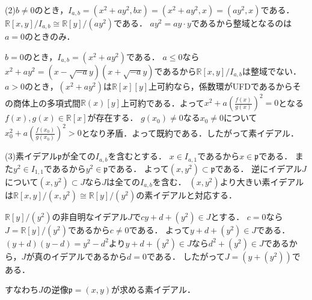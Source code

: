 \documentclass[
		book,
		head_space=20mm,
		foot_space=20mm,
		gutter=10mm,
		line_length=190mm
]{jlreq}
\begin{document}
(2)$b\neq0$のとき，$I_{a,b}=(x^2+ay^2,bx)=(x^2+ay^2,x)=(ay^2,x)$である．
$\mathbb{R}[x,y]/I_{a,b}\cong \mathbb{R}[y]/(ay^2)$である．
$ay^2=ay\cdot y$であるから整域となるのは$a=0$のときのみ．

$b=0$のとき，$I_{a,b}=(x^2+ay^2)$である．
$a\le0$なら$x^2+ay^2=(x-\sqrt{-a}y)(x+\sqrt{-a}y)$であるから$\mathbb{R}[x,y]/I_{a,b}$は整域でない．
$a>0$のとき，$(x^2+ay^2)$は$\mathbb{R}[x][y]$上可約なら，係数環がUFDであるからその商体上の多項式間$\mathbb{R}(x)[y]$上可約である．よって$x^2+a(\frac{f(x)}{g(x)})^2=0$となる$f(x),g(x)\in \mathbb{R}[x]$が存在する．
$g(x_0)\neq 0$なる$x_0\neq 0$について$x_0^2+a(\frac{f(x_0)}{g(x_0)})^2>0$となり矛盾．よって既約である．したがって素イデアル．


(3)素イデアル$\mathfrak{p} $が全ての$I_{a,b}$を含むとする．
$x\in I_{a,1}$であるから$x\in \mathfrak{p}$である．
また$y^2\in I_{1,1}$であるから$y^2\in \mathfrak{p}$である．
よって$(x,y^2)\subset \mathfrak{p}$である．
逆にイデアル$J$について$(x,y^2)\subset J$なら$J$は全ての$I_{a,b}$を含む．
$(x,y^2)$より大きい素イデアルは$\mathbb{R}[x,y]/(x,y^2)\cong \mathbb{R}[y]/(y^2)$の素イデアルと対応する．

$\mathbb{R}[y]/(y^2)$の非自明なイデアル$J$で$cy+d+(y^2)\in J$とする．
$c=0$なら$J=\mathbb{R}[y]/(y^2)$であるから$c\neq 0$である．
よって$y+d +(y^2)\in J$である．$(y+d)(y-d)=y^2-d^2$より$y+d+(y^2)\in J$なら$d^2+(y^2)\in J$であるから，$J$が真のイデアルであるから$d=0$である．
したがって$J=(y+(y^2))$である．

すなわち$J$の逆像$\mathfrak{p}=(x,y)$が求める素イデアル．
\end{document}
